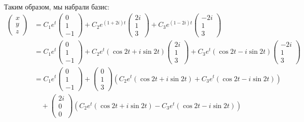 Таким образом, мы набрали базис:
\begin{align*}
    \begin{pmatrix} x \\ y \\ z \end{pmatrix} & = C_1 e^t \begin{pmatrix} 0 \\ 1 \\ - 1 \end{pmatrix} + C_2 e^{(1 + 2i)t} \begin{pmatrix} 2i \\ 1 \\ 3 \end{pmatrix} + C_3 e^{(1 - 2i)t} \begin{pmatrix} -2i \\ 1 \\ 3 \end{pmatrix}                         \\
                               & = C_1 e^t \begin{pmatrix} 0 \\ 1 \\ - 1 \end{pmatrix} + C_2 e^{t}(\cos 2t + i\sin 2t) \begin{pmatrix} 2i \\ 1 \\ 3 \end{pmatrix} + C_3 e^{t}(\cos 2t - i\sin 2t) \begin{pmatrix} -2i \\ 1 \\ 3 \end{pmatrix} \\
                               & = C_1 e^t \begin{pmatrix} 0 \\ 1 \\ - 1 \end{pmatrix} + \begin{pmatrix} 0 \\ 1 \\ 3 \end{pmatrix} (C_2 e^{t}(\cos 2t + i\sin 2t) + C_3 e^{t}(\cos 2t - i\sin 2t))                          \\
                               & \quad + \begin{pmatrix} 2i \\ 0 \\ 0 \end{pmatrix} (C_2 e^{t}(\cos 2t + i\sin 2t) - C_3 e^{t}(\cos 2t - i\sin 2t))                                                         \\

\end{align*}
